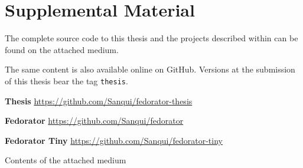 \chapter{Supplemental Material}

The complete source code to this thesis and the projects described within can be found on the attached medium.  

The same content is also available online on GitHub.  Versions at the submission of this thesis bear the tag \texttt{thesis}.

\noindent \textbf{Thesis} \hfill
    \url{https://github.com/Sanqui/fedorator-thesis}

\noindent \textbf{Fedorator} \hfill
    \url{https://github.com/Sanqui/fedorator}
    
\noindent \textbf{Fedorator Tiny} \hfill
    \url{https://github.com/Sanqui/fedorator-tiny}

\vfill

\begin{dirfigure}%
\caption{Contents of the attached medium}
\end{dirfigure}
